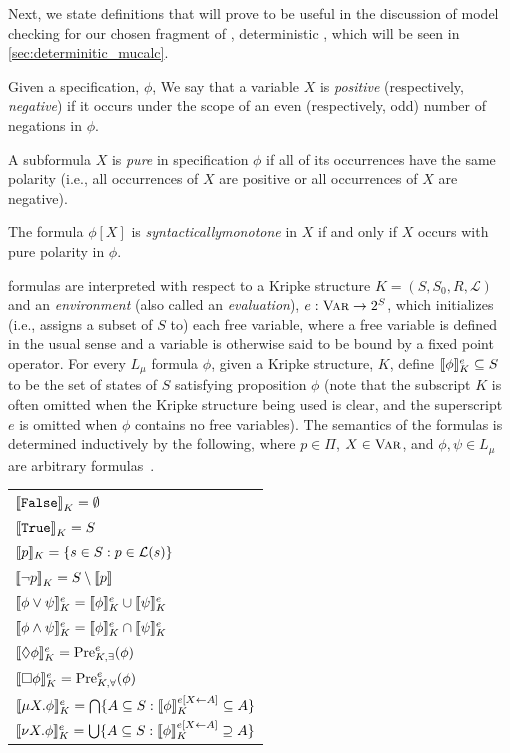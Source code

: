 Next, we state definitions that will prove to be useful in the discussion of model checking for our chosen fragment of \mucalc{}, deterministic \mucalc{}, which will be seen in \autoref{sec:determinitic_mucalc}.

\begin{defn}
    Given a \mucalc{} specification, $\phi$, We say that a variable $X$ is {\em positive\/} (respectively, {\em negative\/}) if it occurs under the scope of an even (respectively, odd) number of negations in $\phi$.
\end{defn}

\begin{defn}
    A subformula $X$ is {\em pure\/} in \mucalc{} specification $\phi$ if all of its occurrences have the same polarity (i.e., all occurrences of $X$ are positive or all occurrences of $X$ are negative).
\end{defn}

\begin{defn}
    The formula $\phi[X]$ is {\em syntactically\/monotone} in $X$ if and only if $X$ occurs with pure polarity in $\phi$.
\end{defn}


\muCalc{} formulas are interpreted with respect to a Kripke structure $K = (S,S_0,R,\mathcal{L})$ and an {\em environment\/} (also called an {\em evaluation\/}), $e: \textsc{Var} \to 2^S$, which initializes (i.e., assigns a subset of $S$ to) each free variable, where a free variable is defined in the usual sense and a variable is otherwise said to be bound by a fixed point operator. For every $L_\mu$ formula $\phi$, given a Kripke structure, $K$, define ${\llbracket}{} \phi {\rrbracket}{}_K^e \subseteq S$ to be the set of states of $S$ satisfying proposition $\phi$ (note that the subscript $K$ is often omitted when the Kripke structure being used is clear, and the superscript $e$ is omitted when $\phi$ contains no free variables). The semantics of the formulas is determined inductively by the following, where $p \in \Pi$, $X \in \textsc{Var}$, and $\phi, \psi \in L_\mu$ are arbitrary formulas~\cite{Wilke2001}.

\begin{tabular}{l}
    ${\llbracket} {\texttt{False}} {\rrbracket}_K = \emptyset$ \\
    ${\llbracket} {\texttt{True}} {\rrbracket}_K = S$ \\
    ${\llbracket}{} p {\rrbracket}{}_K = \{s \in S : p \in \mathcal{L}(s) \}$ \\    
    ${\llbracket} \lnot p {\rrbracket}_K = S \setminus {\llbracket} p {\rrbracket}$ \\
    ${\llbracket}{} \phi \lor \psi {\rrbracket}{}_K^e = {\llbracket}{} \phi {\rrbracket}{}_K^e \cup {\llbracket}{} \psi {\rrbracket}{}_K^e $ \\ 
    ${\llbracket}{} \phi \land \psi {\rrbracket}{}_K^e = {\llbracket}{} \phi {\rrbracket}{}_K^e \cap {\llbracket}{} \psi {\rrbracket}{}_K^e $ \\
    ${\llbracket}{} \Diamond \phi {\rrbracket}{}_K^e = \text{Pre}_{K,\exists}^{e} (\phi)$ \\
    ${\llbracket}{} \square \phi {\rrbracket}{}_K^e = \text{Pre}_{K,\forall}^e (\phi)$ \\
    ${\llbracket}{} \mu X. \phi {\rrbracket}{}_K^e = \bigcap \{ A \subseteq S : {\llbracket}{} \phi {\rrbracket}{}_K^{e[X \leftarrow A]} \subseteq A \}$ \\
    ${\llbracket}{} \nu X. \phi {\rrbracket}{}_K^e = \bigcup \{ A \subseteq S : {\llbracket}{} \phi {\rrbracket}{}_K^{e[X \leftarrow A]} \supseteq A \}$
\end{tabular}

